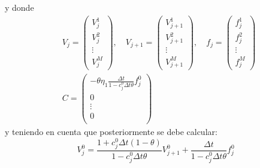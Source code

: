 y donde
\begin{align*}
    &\boxed{
        V_j = \begin{pmatrix}
            V_j^1 \\
            V_j^2 \\
            \vdots \\
            V_j^M
        \end{pmatrix}, \quad
        V_{j+1} = \begin{pmatrix}
            V_{j+1}^1 \\
            V_{j+1}^2 \\
            \vdots \\
            V_{j+1}^M
        \end{pmatrix}, \quad
        f_j = \begin{pmatrix}
            f_j^1 \\
            f_j^2 \\
            \vdots \\
            f_j^M
        \end{pmatrix}
    } \\
    &\boxed{
        C = \begin{pmatrix}
            -\theta\eta_1 \frac{\Delta t}{1 - c_j^0 \Delta t \theta}f_j^0 \\
            0 \\
            \vdots \\
            0 \\
        \end{pmatrix}
    }
\end{align*}
y teniendo en cuenta que posteriormente se debe calcular:
\begin{equation*}
    \boxed{V_j^0 = \frac{1 + c_j^0 \Delta t (1-\theta)}{1 - c_j^0 \Delta t \theta} V_{j+1}^0 + \frac{\Delta t}{1 - c_j^0 \Delta t \theta} f_j^0}
\end{equation*}






